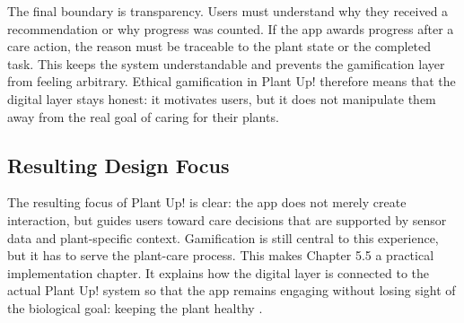 The final boundary is transparency. Users must understand why they received a recommendation or why progress was counted. If the app awards progress after a care action, the reason must be traceable to the plant state or the completed task. This keeps the system understandable and prevents the gamification layer from feeling arbitrary. Ethical gamification in Plant Up! therefore means that the digital layer stays honest: it motivates users, but it does not manipulate them away from the real goal of caring for their plants.

\subsection{Resulting Design Focus}

The resulting focus of Plant Up! is clear: the app does not merely create interaction, but guides users toward care decisions that are supported by sensor data and plant-specific context. Gamification is still central to this experience, but it has to serve the plant-care process. This makes Chapter 5.5 a practical implementation chapter. It explains how the digital layer is connected to the actual Plant Up! system so that the app remains engaging without losing sight of the biological goal: keeping the plant healthy \cite{plantUpProject,smarticoGamification,deterding2011}.
